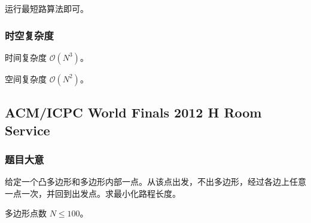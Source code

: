 				运行最短路算法即可。
			\subsubsection{时空复杂度}
				时间复杂度 $\mathcal{O}\left(N^3\right)$。
					
				空间复杂度 $\mathcal{O}\left(N^2\right)$。
		\newpage
		\subsection{ACM/ICPC World Finals 2012 H Room Service}
			\subsubsection{题目大意}
				给定一个凸多边形和多边形内部一点。从该点出发，不出多边形，经过各边上任意一点一次，并回到出发点。求最小化路程长度。
					
				多边形点数 $N \le 100$。
